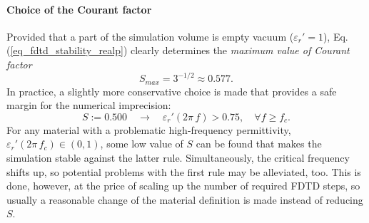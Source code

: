 \paragraph{Choice of the Courant factor}%
Provided that a part of the simulation volume is empty vacuum ($\varepsilon_r'=1$), Eq. (\ref{eq_fdtd_stability_realp}) clearly determines the \textit{maximum value of Courant factor} 
$$S_{max} = 3^{-1/2}\approx0.577.$$
In practice, a slightly more conservative choice is made that provides a safe margin for the numerical imprecision: 
\begin{equation} S:= 0.500 \quad \rightarrow \quad \varepsilon_r'(2\pi\,f)> 0.75, \quad \forall f \geq f_c. \label{eq_courant_choice}\end{equation}
For any material with a problematic high-frequency permittivity, $\varepsilon_r'(2\pi\,f_c) \in (0, 1)$, some low value of $S$ can be found that makes the simulation stable against the latter rule. Simultaneously, the critical frequency shifts up, so potential problems with the first rule may be alleviated, too. This is done, however, at the price of scaling up the number of required FDTD steps, so usually a reasonable change of the material definition is made instead of reducing $S$.




